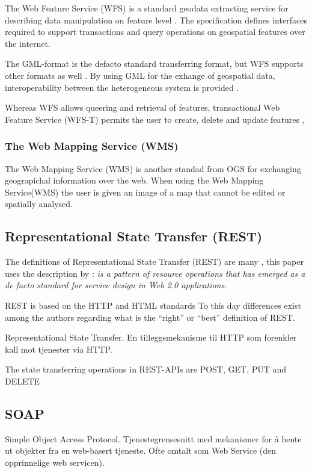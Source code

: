 The Web Feature Service (WFS) is a standard geodata extracting service for describing data manipulation on feature level \citep{Peng2005, Norgedigitalt2014}. The specification defines interfaces required to support transactions and query operations on geospatial features over the internet.

The GML-format is the defacto standard transferring format, but WFS supports other formats as well \citep{Eggan2017}. By using GML for the exhange of geospatial data,  interoperability between the heterogeneous system is provided \citep{YaoXiaobai2008Iimo}.

Whereas WFS allows queering and retrieval of features, transactional Web Feature Service (WFS-T) permits the user to create, delete and update features \citep{OGCNetwork},

\subsubsection{The Web Mapping Service (WMS)}
The Web Mapping Service (WMS) is another standad from OGS for exchanging geograpichal information over the web. When using the Web Mapping Service(WMS) the user is given an image of a map that cannot be edited or spatially analysed. 	


\subsection{Representational State Transfer (REST)}
The definitions of Representational State Transfer (REST) are many \citep{Fielding, Richardson}, this paper uses the description by \cite{Battle2008}: \textit{ is a pattern of resource operations that has emerged as a de facto standard for service design in Web 2.0 applications.} 


REST is based on the HTTP and HTML standards 
To this day differences exist among the authors regarding what
is the “right” or “best” definition of REST.

Representational State Transfer. En tilleggsmekanisme til HTTP som forenkler kall mot tjenester via HTTP. 

The state transferring operations in REST-APIs are POST, GET, PUT and DELETE

\subsection{SOAP}
Simple Object Access Protocol. Tjenestegrensesnitt med
mekanismer for å hente ut objekter fra en web-basert tjeneste.
Ofte omtalt som Web Service (den opprinnelige web servicen). 

